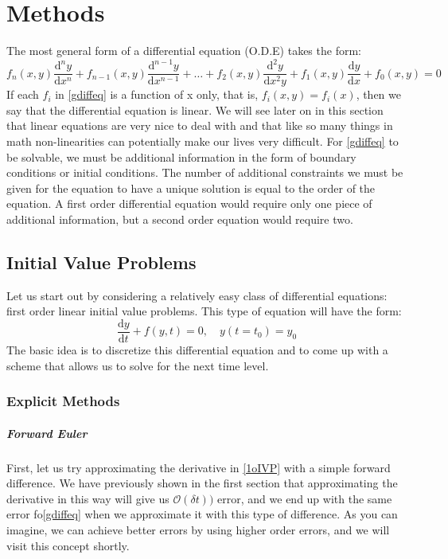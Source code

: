 \documentclass[]{article}
\theoremstyle{definition}
\numberwithin{equation}{section}
\begin{document}
	\section{Methods}
	The most general form of a differential equation (O.D.E) takes the form:
	\begin{equation}
	f_n(x,y) \frac{\text{d}^ny}{\text{d}x^n} + f_{n-1}(x,y) \frac{\text{d}^{n-1}y}{\text{d}x^{n-1}} + \ldots + f_2(x,y) \frac{\text{d}^2y}{\text{d}x^2y} + f_1(x,y) \frac{\text{d}y}{\text{d}x} + f_0(x,y) = 0 \label{gdiffeq}
	\end{equation}
	If each $f_i$ in \eqref{gdiffeq} is a function of x only, that is, $f_i(x,y) = f_i(x)$, then we say that the differential equation is linear. We will see later on in this section that linear equations are very nice to deal with and that like so many things in math non-linearities can potentially make our lives very difficult. For \eqref{gdiffeq} to be solvable, we must be additional information in the form of boundary conditions or initial conditions. The number of additional constraints we must be given for the equation to have a unique solution is equal to the order of the equation. A first order differential equation would require only one piece of additional information, but a second order equation would require two.
	\subsection{Initial Value Problems}
	Let us start out by considering a relatively easy class of differential equations: first order linear initial value problems. This type of equation will have the form:
	\begin{equation}
	\frac{\text{d}y}{\text{d}t} + f(y,t) = 0, \quad y(t=t_0) = y_0 \label{1oIVP}
	\end{equation}
	The basic idea is to discretize this differential equation and to come up with a scheme that allows us to solve for the next time level.
	\subsubsection{Explicit Methods}
	\subparagraph{Forward Euler}
	First, let us try approximating the derivative in \eqref{1oIVP} with a simple forward difference. We have previously shown in the first section that approximating the derivative in this way will give us $\mathcal{O}(\delta t))$ error, and we end up with the same error fo\eqref{gdiffeq} when we approximate it with this type of difference. As you can imagine, we can achieve better errors by using higher order errors, and we will visit this concept shortly.
	
\end{document}
